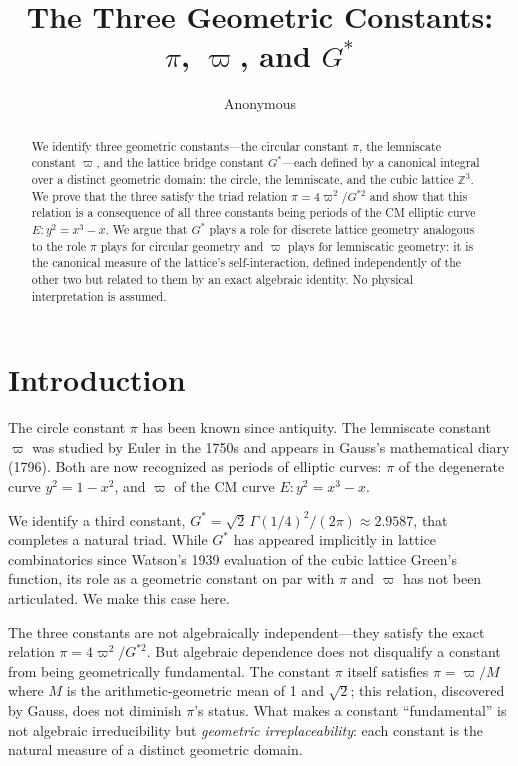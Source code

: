 \documentclass[12pt]{article}
\title{\textbf{The Three Geometric Constants: \\[0.3cm]
$\pi$, $\varpi$, and $G^*$}}
\author{Anonymous}
\date{}
\theoremstyle{definition}
\theoremstyle{remark}
\begin{document}
\maketitle

\begin{abstract}
\noindent We identify three geometric constants---the circular constant $\pi$, the lemniscate constant $\varpi$, and the lattice bridge constant $G^*$---each defined by a canonical integral over a distinct geometric domain: the circle, the lemniscate, and the cubic lattice $\mathbb{Z}^3$. We prove that the three satisfy the triad relation $\pi = 4\varpi^2/G^{*2}$ and show that this relation is a consequence of all three constants being periods of the CM elliptic curve $E\!: y^2 = x^3 - x$. We argue that $G^*$ plays a role for discrete lattice geometry analogous to the role $\pi$ plays for circular geometry and $\varpi$ plays for lemniscatic geometry: it is the canonical measure of the lattice's self-interaction, defined independently of the other two but related to them by an exact algebraic identity. No physical interpretation is assumed.
\end{abstract}

\tableofcontents

\section{Introduction}

The circle constant $\pi$ has been known since antiquity. The lemniscate constant $\varpi$ was studied by Euler in the 1750s and appears in Gauss's mathematical diary (1796). Both are now recognized as periods of elliptic curves: $\pi$ of the degenerate curve $y^2 = 1 - x^2$, and $\varpi$ of the CM curve $E\!: y^2 = x^3 - x$.

We identify a third constant, $G^* = \sqrt{2}\,\Gamma(1/4)^2/(2\pi) \approx 2.9587$, that completes a natural triad. While $G^*$ has appeared implicitly in lattice combinatorics since Watson's 1939 evaluation of the cubic lattice Green's function, its role as a geometric constant on par with $\pi$ and $\varpi$ has not been articulated. We make this case here.

The three constants are not algebraically independent---they satisfy the exact relation $\pi = 4\varpi^2/G^{*2}$. But algebraic dependence does not disqualify a constant from being geometrically fundamental. The constant $\pi$ itself satisfies $\pi = \varpi / M$ where $M$ is the arithmetic-geometric mean of 1 and $\sqrt{2}$; this relation, discovered by Gauss, does not diminish $\pi$'s status. What makes a constant ``fundamental'' is not algebraic irreducibility but \emph{geometric irreplaceability}: each constant is the natural measure of a distinct geometric domain.
\end{document}
